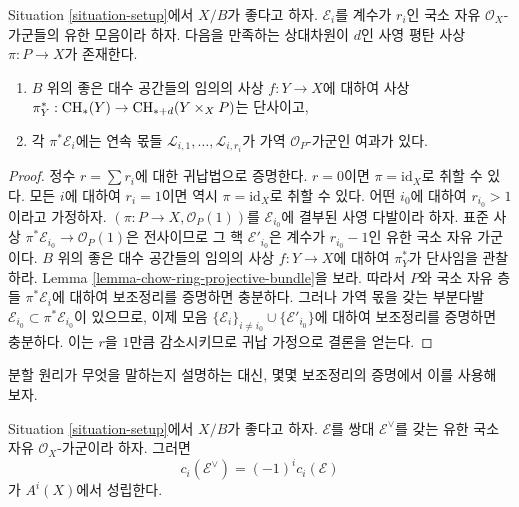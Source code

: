 \begin{lemma}
\label{lemma-splitting-principle}
Situation \ref{situation-setup}에서 $X/B$가 좋다고 하자.
$\mathcal{E}_i$를 계수가 $r_i$인 국소 자유
$\mathcal{O}_X$-가군들의 유한 모음이라 하자.
다음을 만족하는 상대차원이 $d$인 사영 평탄 사상
$\pi : P \to X$가 존재한다.
\begin{enumerate}
\item $B$ 위의 좋은 대수 공간들의 임의의 사상
$f : Y \to X$에 대하여 사상
$\pi_Y^* : \mathop{\mathrm{CH}}\nolimits_*(Y) \to \mathop{\mathrm{CH}}\nolimits_{* + d}(Y \times_X P)$는 단사이고,
\item 각 $\pi^*\mathcal{E}_i$에는 연속 몫들
$\mathcal{L}_{i, 1}, \ldots, \mathcal{L}_{i, r_i}$가 가역
${\mathcal O}_P$-가군인 여과가 있다.
\end{enumerate}
\end{lemma}

\begin{proof}
정수 $r = \sum r_i$에 대한 귀납법으로 증명한다.
$r = 0$이면 $\pi = \text{id}_X$로 취할 수 있다.
모든 $i$에 대하여 $r_i = 1$이면 역시
$\pi = \text{id}_X$로 취할 수 있다.
어떤 $i_0$에 대하여 $r_{i_0} > 1$이라고 가정하자.
$(\pi : P \to X, \mathcal{O}_P(1))$를
$\mathcal{E}_{i_0}$에 결부된 사영 다발이라 하자.
표준 사상 $\pi^*\mathcal{E}_{i_0} \to \mathcal{O}_P(1)$은
전사이므로 그 핵 $\mathcal{E}'_{i_0}$은 계수가
$r_{i_0} - 1$인 유한 국소 자유 가군이다.
$B$ 위의 좋은 대수 공간들의 임의의 사상
$f : Y \to X$에 대하여 $\pi_Y^*$가 단사임을 관찰하라.
Lemma \ref{lemma-chow-ring-projective-bundle}을 보라.
따라서 $P$와 국소 자유 층들 $\pi^*\mathcal{E}_i$에 대하여
보조정리를 증명하면 충분하다. 그러나 가역 몫을 갖는 부분다발
$\mathcal{E}_{i_0} \subset \pi^*\mathcal{E}_{i_0}$이 있으므로,
이제 모음
$\{\mathcal{E}_i\}_{i \not = i_0} \cup \{\mathcal{E}'_{i_0}\}$에
대하여 보조정리를 증명하면 충분하다.
이는 $r$을 $1$만큼 감소시키므로 귀납 가정으로 결론을 얻는다.
\end{proof}

\noindent
분할 원리가 무엇을 말하는지 설명하는 대신, 몇몇 보조정리의 증명에서
이를 사용해 보자.

\begin{lemma}
\label{lemma-chern-classes-dual}
Situation \ref{situation-setup}에서 $X/B$가 좋다고 하자.
$\mathcal{E}$를 쌍대 $\mathcal{E}^\vee$를 갖는 유한 국소 자유
$\mathcal{O}_X$-가군이라 하자. 그러면
$$
c_i(\mathcal{E}^\vee) = (-1)^i c_i(\mathcal{E})
$$
가 $A^i(X)$에서 성립한다.
\end{lemma}


